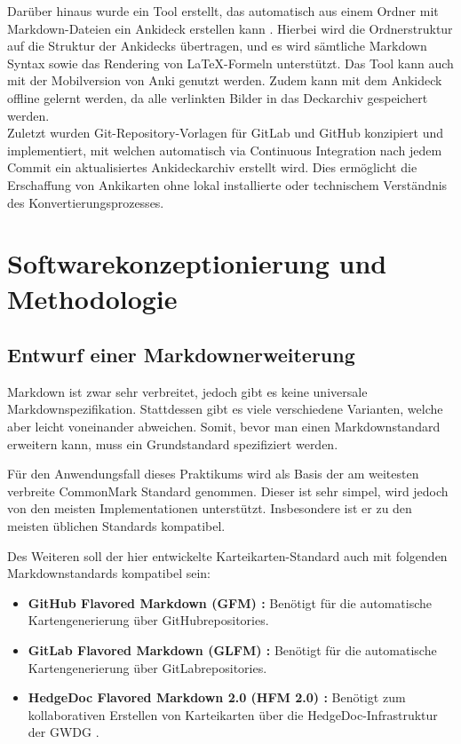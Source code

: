 \documentclass[ngerman]{article}
\begin{document}
Darüber hinaus wurde ein Tool erstellt, das automatisch aus einem Ordner mit Markdown-Dateien ein Ankideck erstellen kann \cite{Ankiding}. Hierbei wird die Ordnerstruktur auf die Struktur der Ankidecks übertragen, und es wird sämtliche Markdown Syntax sowie das Rendering von \LaTeX-Formeln unterstützt. Das Tool kann auch mit der Mobilversion von Anki genutzt werden. Zudem kann mit dem Ankideck offline gelernt werden, da alle verlinkten Bilder in das Deckarchiv gespeichert werden.\\

Zuletzt wurden Git-Repository-Vorlagen für GitLab \cite{GitlabTemplate} und GitHub \cite{GithubTemplate} konzipiert und implementiert, mit welchen automatisch via Continuous Integration nach jedem Commit ein aktualisiertes Ankideckarchiv erstellt wird. Dies ermöglicht die Erschaffung von Ankikarten ohne lokal installierte oder technischem Verständnis des Konvertierungsprozesses.

\newpage


\section{Softwarekonzeptionierung und Methodologie}
\subsection{Entwurf einer Markdownerweiterung}
Markdown ist zwar sehr verbreitet, jedoch gibt es keine universale Markdownspezifikation. Stattdessen gibt es viele verschiedene Varianten, welche aber leicht voneinander abweichen. Somit, bevor man einen Markdownstandard erweitern kann, muss ein Grundstandard spezifiziert werden.

Für den Anwendungsfall dieses Praktikums wird als Basis der am weitesten verbreite CommonMark \cite{CommonMark} Standard genommen. Dieser ist sehr simpel, wird jedoch von den meisten Implementationen unterstützt. Insbesondere ist er zu den meisten üblichen Standards kompatibel.

Des Weiteren soll der hier entwickelte Karteikarten-Standard auch mit folgenden Markdownstandards kompatibel sein:
\begin{itemize}
  \item \textbf{GitHub Flavored Markdown (GFM) \cite{GFM}:} Benötigt für die automatische Kartengenerierung über GitHubrepositories.
  \item \textbf{GitLab Flavored Markdown (GLFM) \cite{GLFM} :} Benötigt für die automatische Kartengenerierung über GitLabrepositories.
  \item \textbf{HedgeDoc Flavored Markdown 2.0 (HFM 2.0) \cite{HFM2}:} Benötigt zum kollaborativen Erstellen von Karteikarten über die HedgeDoc-Infrastruktur der GWDG \cite{HedgeDocGWDG}.
\end{itemize}
\end{document}

